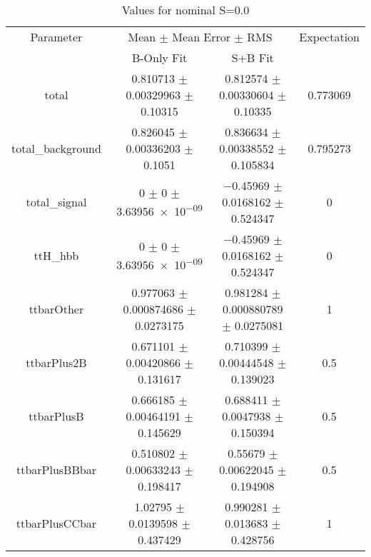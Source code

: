 \begin{table}
\centering
\caption{Values for nominal S=0.0}
\begin{tabular}{cccc}
\toprule
Parameter & \multicolumn{2}{c}{Mean $\pm$ Mean Error $\pm$ RMS} & Expectation\\
 & B-Only Fit & S+B Fit & \\
\midrule
total & \num{0.810713} $\pm$ \num{0.00329963} $\pm$ \num{0.10315} & \num{0.812574} $\pm$ \num{0.00330604} $\pm$ \num{0.10335} & \num{0.773069}\\
total\_background & \num{0.826045} $\pm$ \num{0.00336203} $\pm$ \num{0.1051} & \num{0.836634} $\pm$ \num{0.00338552} $\pm$ \num{0.105834} & \num{0.795273}\\
total\_signal & \num{0} $\pm$ \num{0} $\pm$ \num{3.63956e-09} & \num{-0.45969} $\pm$ \num{0.0168162} $\pm$ \num{0.524347} & \num{0}\\
ttH\_hbb & \num{0} $\pm$ \num{0} $\pm$ \num{3.63956e-09} & \num{-0.45969} $\pm$ \num{0.0168162} $\pm$ \num{0.524347} & \num{0}\\
ttbarOther & \num{0.977063} $\pm$ \num{0.000874686} $\pm$ \num{0.0273175} & \num{0.981284} $\pm$ \num{0.000880789} $\pm$ \num{0.0275081} & \num{1}\\
ttbarPlus2B & \num{0.671101} $\pm$ \num{0.00420866} $\pm$ \num{0.131617} & \num{0.710399} $\pm$ \num{0.00444548} $\pm$ \num{0.139023} & \num{0.5}\\
ttbarPlusB & \num{0.666185} $\pm$ \num{0.00464191} $\pm$ \num{0.145629} & \num{0.688411} $\pm$ \num{0.0047938} $\pm$ \num{0.150394} & \num{0.5}\\
ttbarPlusBBbar & \num{0.510802} $\pm$ \num{0.00633243} $\pm$ \num{0.198417} & \num{0.55679} $\pm$ \num{0.00622045} $\pm$ \num{0.194908} & \num{0.5}\\
ttbarPlusCCbar & \num{1.02795} $\pm$ \num{0.0139598} $\pm$ \num{0.437429} & \num{0.990281} $\pm$ \num{0.013683} $\pm$ \num{0.428756} & \num{1}\\
\bottomrule
\end{tabular}
\end{table}